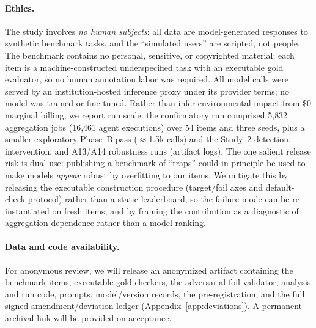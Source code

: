 \documentclass[acmsmall,screen,review,anonymous]{acmart}
\begin{document}
\paragraph{Ethics.} The study involves \emph{no human subjects}: all data are model-generated responses to
synthetic benchmark tasks, and the ``simulated users'' are scripted, not people. The benchmark contains no
personal, sensitive, or copyrighted material; each item is a machine-constructed underspecified task with an
executable gold evaluator, so no human annotation labor was required. All model calls were served by an institution-hosted inference proxy under its provider terms; no model was
trained or fine-tuned. Rather than infer environmental impact from \$0 marginal billing, we report run scale:
the confirmatory run comprised 5{,}832 aggregation jobs (16{,}461 agent executions) over 54
items and three seeds, plus a smaller exploratory Phase~B pass ($\approx$1.5k calls) and the Study~2
detection, intervention, and A13/A14 robustness runs (artifact logs). The one salient
release risk is dual-use: publishing a benchmark of ``traps'' could in principle be used to make models
\emph{appear} robust by overfitting to our items. We mitigate this by releasing the executable construction
procedure (target/foil axes and default-check protocol) rather than a static leaderboard, so the failure mode
can be re-instantiated on fresh items, and by framing the contribution as a diagnostic of aggregation
dependence rather than a model ranking.
\paragraph{Data and code availability.} For anonymous review, we will release an anonymized artifact
containing the benchmark items, executable gold-checkers, the adversarial-foil validator, analysis and run
code, prompts, model/version records, the pre-registration, and the full signed amendment/deviation ledger
(Appendix~\ref{app:deviations}). A permanent archival link will be provided on acceptance.

\end{document}
